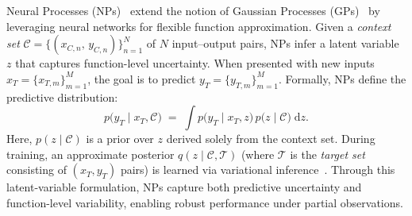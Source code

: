 Neural Processes (NPs)~\citep{garnelo2018neural,kim2019attentive} extend the notion of Gaussian Processes (GPs)~\citep{rasmussen2003gaussian} by leveraging neural networks for flexible function approximation.  
Given a \emph{context set} 
\(
\mathcal{C} 
= \{(x_{C,n},\, y_{C,n})\}_{n=1}^{N}
\)
of $N$ input--output pairs, NPs infer a latent variable $z$ that captures function-level uncertainty.  
When presented with new inputs
\(
x_T 
= \{x_{T,m}\}_{m=1}^M
\),
the goal is to predict
\(
y_T 
= \{y_{T,m}\}_{m=1}^M
\).
Formally, NPs define the predictive distribution:
\begin{equation}
\label{eq:np}
p\bigl(y_T \mid x_T, \mathcal{C}\bigr)
\;=\;
\int
p\bigl(y_T \mid x_T, z\bigr)
\,p\bigl(z \mid \mathcal{C}\bigr)
\;\mathrm{d}z.
\end{equation}
Here, \(p(z \mid \mathcal{C})\) is a prior over \(z\) derived solely from the context set.  
During training, an approximate posterior \(q(z \mid \mathcal{C}, \mathcal{T})\) (where \(\mathcal{T}\) is the \emph{target set} consisting of \((x_{T}, y_{T})\) pairs) is learned via variational inference~\citep{garnelo2018neural}.  
Through this latent-variable formulation, NPs capture both predictive uncertainty and function-level variability, enabling robust performance under partial observations.





